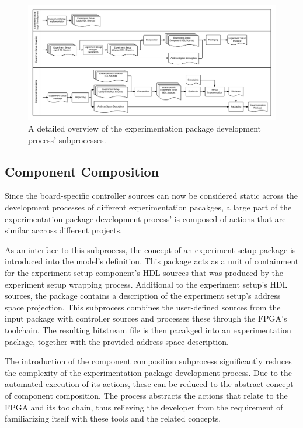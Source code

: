 \documentclass[main.tex]{subfiles}
\begin{document}
\begin{figure}[h]
    \caption{A detailed overview of the experimentation package development process' subprocesses.}
    \label{fig:processes-abstract-automation}
    \centering
    \includegraphics[width=\textwidth]{img/processes-abstract-automation}
\end{figure}

\subsection{Component Composition}
\label{sectioncomponentcomposition}
Since the board-specific controller sources can now be considered static across the development processes of different experimentation pacakges, a large part of the experimentation package development process' is composed of actions that are similar accross different projects. 

As an interface to this subprocess, the concept of an experiment setup package is introduced into the model's definition. This package acts as a unit of containment for the experiment setup component's HDL sources that was produced by the experiment setup wrapping process. Additional to the experiment setup's HDL sources, the package contains a description of the experiment setup's address space projection. This subprocess combines the user-defined sources from the input package with controller sources and processes these through the FPGA's toolchain. The resulting bitstream file is then pacakged into an experimentation package, together with the provided address space description.

The introduction of the component composition subprocess significantly reduces the complexity of the experimentation package development process. Due to the automated execution of its actions, these can be reduced to the abstract concept of component composition. The process abstracts the actions that relate to the FPGA and its toolchain, thus relieving the developer from the requirement of familiarizing itself with these tools and the related concepts.
\end{document}
